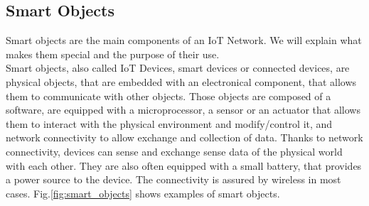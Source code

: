

\subsection{Smart Objects}

Smart objects are the main components of an IoT Network. We will explain what makes them special and the purpose of their use.\\

Smart objects, also called IoT Devices, smart devices or connected devices, are physical objects, that are embedded with an electronical component, that allows them to communicate with other objects. Those objects are composed of a software, are equipped with a microprocessor, a sensor or an actuator that allows them to interact with the physical environment and modify/control it, and network connectivity to allow exchange and collection of data. Thanks to network connectivity, devices can sense and exchange sense data of the physical world with each other. They are also often equipped with a small battery, that provides a power source to the device. The connectivity is assured by wireless in most cases. Fig.\ref{fig:smart_objects} shows examples of smart objects.\\

